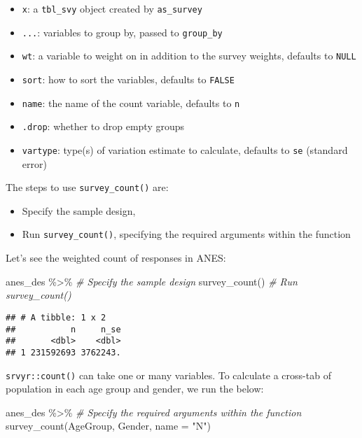 \documentclass[
]{krantz}
\makeatletter
\newenvironment{Shaded}{\begin{snugshade}}{\end{snugshade}}
\newcommand{\AttributeTok}[1]{\textcolor[rgb]{0.61,0.61,0.61}{#1}}
\newcommand{\CommentTok}[1]{\textcolor[rgb]{0.37,0.37,0.37}{\textit{#1}}}
\newcommand{\FunctionTok}[1]{\textcolor[rgb]{0,0,0}{#1}}
\newcommand{\NormalTok}[1]{#1}
\newcommand{\SpecialCharTok}[1]{\textcolor[rgb]{0,0,0}{#1}}
\newcommand{\StringTok}[1]{\textcolor[rgb]{0.5,0.5,0.5}{#1}}
\providecommand{\tightlist}{%
  \setlength{\itemsep}{0pt}\setlength{\parskip}{0pt}}
\newenvironment{kframe}{%
\medskip{}
\setlength{\fboxsep}{.8em}
 \def\at@end@of@kframe{}%
 \ifinner\ifhmode%
  \def\at@end@of@kframe{\end{minipage}}%
  \begin{minipage}{\columnwidth}%
 \fi\fi%
 \def\FrameCommand##1{\hskip\@totalleftmargin \hskip-\fboxsep
 \colorbox{shadecolor}{##1}\hskip-\fboxsep
     \hskip-\linewidth \hskip-\@totalleftmargin \hskip\columnwidth}%
 \MakeFramed {\advance\hsize-\width
   \@totalleftmargin\z@ \linewidth\hsize
   \@setminipage}}%
 {\par\unskip\endMakeFramed%
 \at@end@of@kframe}
\renewenvironment{Shaded}{\begin{kframe}}{\end{kframe}}
\makeatother
\begin{document}
\begin{itemize}
\tightlist
\item
  \texttt{x}: a \texttt{tbl\_svy} object created by \texttt{as\_survey}
\item
  \texttt{...}: variables to group by, passed to \texttt{group\_by}
\item
  \texttt{wt}: a variable to weight on in addition to the survey weights, defaults to \texttt{NULL}
\item
  \texttt{sort}: how to sort the variables, defaults to \texttt{FALSE}
\item
  \texttt{name}: the name of the count variable, defaults to \texttt{n}
\item
  \texttt{.drop}: whether to drop empty groups
\item
  \texttt{vartype}: type(s) of variation estimate to calculate, defaults to \texttt{se} (standard error)
\end{itemize}

The steps to use \texttt{survey\_count()} are:

\begin{itemize}
\tightlist
\item
  Specify the sample design,
\item
  Run \texttt{survey\_count()}, specifying the required arguments within the function
\end{itemize}

Let's see the weighted count of responses in ANES:

\begin{Shaded}
\begin{Highlighting}[]
\NormalTok{anes\_des }\SpecialCharTok{\%\textgreater{}\%} \CommentTok{\#  Specify the sample design}
  \FunctionTok{survey\_count}\NormalTok{() }\CommentTok{\# Run \textasciigrave{}survey\_count()\textasciigrave{}}
\end{Highlighting}
\end{Shaded}

\begin{verbatim}
## # A tibble: 1 x 2
##           n     n_se
##       <dbl>    <dbl>
## 1 231592693 3762243.
\end{verbatim}

\texttt{srvyr::count()} can take one or many variables. To calculate a cross-tab of population in each age group and gender, we run the below:

\begin{Shaded}
\begin{Highlighting}[]
\NormalTok{anes\_des }\SpecialCharTok{\%\textgreater{}\%}
  \CommentTok{\# Specify the required arguments within the function}
  \FunctionTok{survey\_count}\NormalTok{(AgeGroup, Gender, }\AttributeTok{name =} \StringTok{"N"}\NormalTok{) }
\end{Highlighting}
\end{Shaded}
\end{document}
